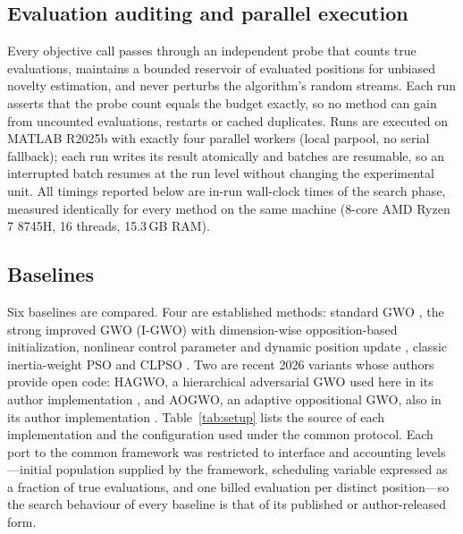 \documentclass[11pt,a4paper]{article}
\begin{document}
\subsection{Evaluation auditing and parallel execution}
Every objective call passes through an independent probe that counts true
evaluations, maintains a bounded reservoir of evaluated positions for unbiased
novelty estimation, and never perturbs the algorithm's random streams. Each
run asserts that the probe count equals the budget exactly, so no method can
gain from uncounted evaluations, restarts or cached duplicates. Runs are
executed on MATLAB R2025b with exactly four parallel workers (local
parpool, no serial fallback); each run writes its result atomically
and batches are resumable, so an interrupted batch resumes at the run level
without changing the experimental unit. All timings reported below are in-run
wall-clock times of the search phase, measured identically for every method on
the same machine (8-core AMD Ryzen 7 8745H, 16 threads, 15.3\,GB RAM).

\subsection{Baselines}
Six baselines are compared. Four are established methods: standard GWO
\citep{mirjalili2014gwo}, the strong improved GWO (I-GWO) with
dimension-wise opposition-based initialization, nonlinear control parameter
and dynamic position update \citep{nadimi2021igwo}, classic inertia-weight PSO
\citep{kennedy1995pso,shi1998modified} and CLPSO \citep{liang2006clpso}. Two
are recent 2026 variants whose authors provide open code: HAGWO, a hierarchical
adversarial GWO used here in its author implementation \citep{su2026hagwo}, and
AOGWO, an adaptive oppositional GWO, also in its author implementation
\citep{khalid2026aogwo}. Table~\ref{tab:setup} lists the source of each
implementation and the configuration used under the common protocol. Each
port to the common framework was restricted to interface and accounting
levels---initial population supplied by the framework, scheduling variable
expressed as a fraction of true evaluations, and one billed evaluation per
distinct position---so the search behaviour of every baseline is that of its
published or author-released form.

\begin{table}[t]
\centering
\small
\caption{Baselines, sources and configuration under the common protocol
($N=50$, identical initial populations, 100{,}000 true evaluations).}
\label{tab:setup}
\resizebox{\linewidth}{!}{}
\end{table}
\end{document}
